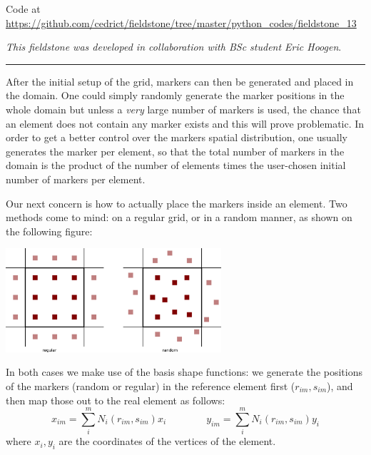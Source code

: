 

\begin{center}
Code at \url{https://github.com/cedrict/fieldstone/tree/master/python_codes/fieldstone_13}
\end{center}

{\sl This fieldstone was developed in collaboration with BSc student Eric Hoogen}. 

\par\noindent\rule{\textwidth}{0.4pt}



After the initial setup of the grid, markers can then be generated and placed in the domain. One could simply randomly generate 
the marker positions in the whole domain but unless a {\it very} large number of markers is used, the chance that an element does 
not contain any marker exists and this will prove problematic. In order to get a better control over the markers spatial distribution, 
one usually generates the marker per element, so that the total number of markers in the domain is the product of the number of 
elements times the user-chosen initial number of markers per element. 

Our next concern is how to actually place the markers inside an element. Two methods come to mind: on a regular grid, or in a random manner, 
as shown on the following figure:

\begin{center}
\includegraphics[width=8cm]{python_codes/fieldstone_13/markers} 
\end{center}

In both cases we make use of the basis shape functions: we generate the positions of the markers (random or regular) in the reference
element first ($r_{im},s_{im}$), and then map those out to the real element as follows:
\begin{equation}
x_{im}=\sum_i^m N_i(r_{im},s_{im}) x_i
\quad\quad\quad\quad
y_{im}=\sum_i^m N_i(r_{im},s_{im}) y_i
\end{equation}
where $x_i,y_i$ are the coordinates of the vertices of the element.

